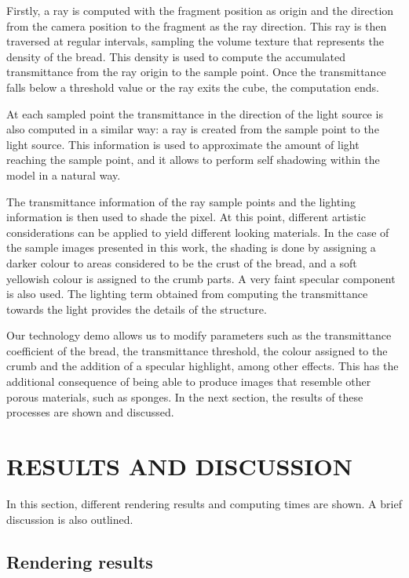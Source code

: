 \documentclass[oneside,a4paper,english,links]{amca}
\begin{document}
Firstly, a ray is computed with the fragment position as origin and
the direction from the camera position to the fragment as the ray
direction. This ray is then traversed at regular intervals, sampling
the volume texture that represents the density of the bread. This
density is used to compute the accumulated transmittance from the ray
origin to the sample point. Once the transmittance falls below a
threshold value or the ray exits the cube, the computation ends.

At each sampled point the transmittance in the direction of the light
source is also computed in a similar way: a ray is created from the
sample point to the light source. This information is used to
approximate the amount of light reaching the sample point, and it
allows to perform self shadowing within the model in a natural
way. 

The transmittance information of the ray sample points and the
lighting information is then used to shade the pixel. At this point,
different artistic considerations can be applied to yield different
looking materials. In the case of the sample images presented
in this work, the shading is done by assigning a darker colour to areas
considered to be the crust of the bread, and a soft yellowish colour is
assigned to the crumb parts. A very faint specular component is also
used. The lighting term obtained from computing the transmittance
towards the light provides the details of the structure.

Our technology demo allows us to modify parameters such as the
transmittance coefficient of the bread, the transmittance threshold,
the colour assigned to the crumb and the addition of a specular
highlight, among other effects. This has the additional consequence of
being able to produce images that resemble other porous materials,
such as sponges. In the next section, the results of these processes
are shown and discussed.

\section{RESULTS AND DISCUSSION}

In this section, different rendering results and computing times are shown. A brief discussion is also outlined.

\subsection{Rendering results}
\end{document}
